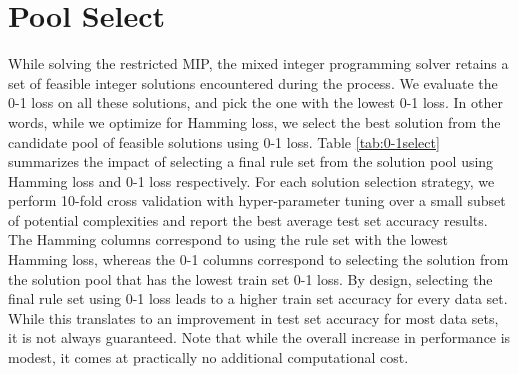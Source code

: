 \documentclass[twoside,11pt]{article}
\begin{document}
\section{Pool Select} \label{sec:solPool}
    
While solving the restricted MIP, the mixed integer programming solver retains a set of feasible integer solutions encountered during the process. We evaluate the 0-1 loss on all these solutions, and pick the one with the lowest 0-1 loss. In other words, while we optimize for Hamming loss, we select the best solution from the candidate pool of feasible solutions using 0-1 loss. Table \ref{tab:0-1select} summarizes the impact of selecting a final rule set from the solution pool using Hamming loss and 0-1 loss respectively. For each solution selection strategy, we perform 10-fold cross validation with hyper-parameter tuning over a small subset of potential complexities and report the best average test set accuracy results. The Hamming columns correspond to using the rule set with the lowest Hamming loss, whereas the 0-1 columns correspond to selecting the solution from the solution pool that has the lowest train set 0-1 loss. By design, selecting the final rule set using 0-1 loss leads to a higher train set accuracy for every data set. While this translates to  an improvement in test set accuracy for most data sets, it is not always guaranteed. Note that while the overall increase in performance is modest, it comes at practically no additional computational cost. 
\end{document}
